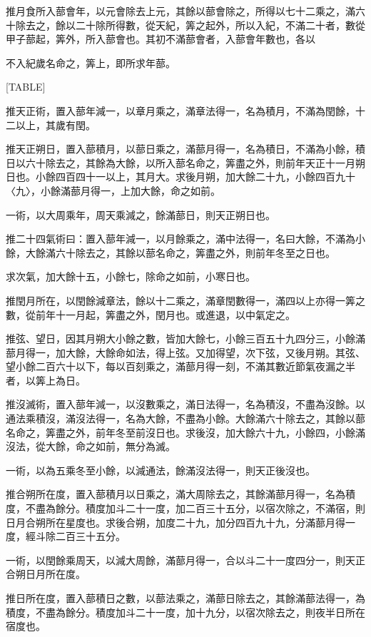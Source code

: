 \begin{pinyinscope}
推月食所入蔀會年，以元會除去上元，其餘以蔀會除之，所得以七十二乘之，滿六十除去之，餘以二十除所得數，從天紀，筭之起外，所以入紀，不滿二十者，數從甲子蔀起，筭外，所入蔀會也。其初不滿蔀會者，入蔀會年數也，各以

不入紀歲名命之，筭上，即所求年蔀。

[TABLE]

推天正術，置入蔀年減一，以章月乘之，滿章法得一，名為積月，不滿為閏餘，十二以上，其歲有閏。

推天正朔日，置入蔀積月，以蔀日乘之，滿蔀月得一，名為積日，不滿為小餘，積日以六十除去之，其餘為大餘，以所入蔀名命之，筭盡之外，則前年天正十一月朔日也。小餘四百四十一以上，其月大。求後月朔，加大餘二十九，小餘四百九十〈九〉，小餘滿蔀月得一，上加大餘，命之如前。

一術，以大周乘年，周天乘減之，餘滿蔀日，則天正朔日也。

推二十四氣術曰：置入蔀年減一，以月餘乘之，滿中法得一，名曰大餘，不滿為小餘，大餘滿六十除去之，其餘以蔀名命之，筭盡之外，則前年冬至之日也。

求次氣，加大餘十五，小餘七，除命之如前，小寒日也。

推閏月所在，以閏餘減章法，餘以十二乘之，滿章閏數得一，滿四以上亦得一筭之數，從前年十一月起，筭盡之外，閏月也。或進退，以中氣定之。

推弦、望日，因其月朔大小餘之數，皆加大餘七，小餘三百五十九四分三，小餘滿蔀月得一，加大餘，大餘命如法，得上弦。又加得望，次下弦，又後月朔。其弦、望小餘二百六十以下，每以百刻乘之，滿蔀月得一刻，不滿其數近節氣夜漏之半者，以筭上為日。

推沒滅術，置入蔀年減一，以沒數乘之，滿日法得一，名為積沒，不盡為沒餘。以通法乘積沒，滿沒法得一，名為大餘，不盡為小餘。大餘滿六十除去之，其餘以蔀名命之，筭盡之外，前年冬至前沒日也。求後沒，加大餘六十九，小餘四，小餘滿沒法，從大餘，命之如前，無分為滅。

一術，以為五乘冬至小餘，以減通法，餘滿沒法得一，則天正後沒也。

推合朔所在度，置入蔀積月以日乘之，滿大周除去之，其餘滿蔀月得一，名為積度，不盡為餘分。積度加斗二十一度，加二百三十五分，以宿次除之，不滿宿，則日月合朔所在星度也。求後合朔，加度二十九，加分四百九十九，分滿蔀月得一度，經斗除二百三十五分。

一術，以閏餘乘周天，以減大周餘，滿蔀月得一，合以斗二十一度四分一，則天正合朔日月所在度。

推日所在度，置入蔀積日之數，以蔀法乘之，滿蔀日除去之，其餘滿蔀法得一，為積度，不盡為餘分。積度加斗二十一度，加十九分，以宿次除去之，則夜半日所在宿度也。


\end{pinyinscope}
